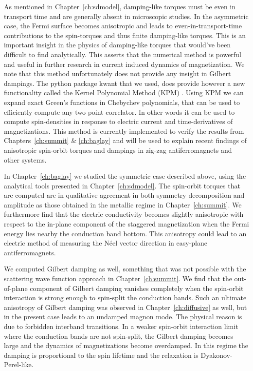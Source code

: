As mentioned in Chapter~\ref{ch:sdmodel}, damping-like torques must be even in transport time and are generally absent in microscopic studies. In the asymmetric case, the Fermi surface becomes anisotropic and leads to even-in-transport-time contributions to the spin-torques and thus finite damping-like torques. This is an important insight in the physics of damping-like torques that would've been difficult to find analytically. This asserts that the numerical method is powerful and useful in further research in current induced dynamics of magnetization. We note that this method unfortunately does not provide any insight in Gilbert dampings. The python package kwant that we used, does provide however a new functionality called the Kernel Polynomial Method (KPM) \cite{weise_kernel_2006}. Using KPM we can expand exact Green's functions in Chebychev polynomials, that can be used to efficiently compute any two-point correlator. In other words it can be used to compute spin-densities in response to electric current and time-derivatives of magnetizations. This method is currently implemented to verify the results from Chapters~\ref{ch:summit} \& \ref{ch:baglay} and will be used to explain recent findings of anisotropic spin-orbit torques and dampings in zig-zag antiferromagnets and other systems.

In Chapter~\ref{ch:baglay} we studied the symmetric case described above, using the analytical tools presented in Chapter~\ref{ch:sdmodel}. The spin-orbit torques that are computed are in qualitative agreement in both symmetry-decomposition and amplitude as those obtained in the metallic regime in Chapter~\ref{ch:summit}. We furthermore find that the electric conductivity becomes slightly anisotropic with respect to the in-plane component of the staggered magnetization when the Fermi energy lies nearby the conduction band bottom. This anisotropy could lead to an electric method of measuring the N\'eel vector direction in easy-plane antiferromagnets. 

We computed Gilbert damping as well, something that was not possible with the scattering wave function approach in Chapter~\ref{ch:summit}. We find that the out-of-plane component of Gilbert damping vanishes completely when the spin-orbit interaction is strong enough to spin-split the conduction bands. Such an ultimate anisotropy of Gilbert damping was observed in Chapter~\ref{ch:diffusive} as well, but in the present case leads to an undamped magnon mode. The physical reason is due to forbidden interband transitions. In a weaker spin-orbit interaction limit where the conduction bands are not spin-split, the Gilbert damping becomes large and the dynamics of magnetizations become overdamped. In this regime the damping is proportional to the spin lifetime and the relaxation is Dyakonov-Perel-like. 

